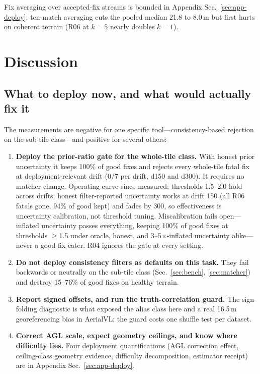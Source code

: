 \documentclass[journal]{IEEEtran}
\begin{document}
Fix averaging over accepted-fix streams is bounded in Appendix Sec.~\ref{sec:app-deploy}: ten-match averaging cuts the pooled median 21.8 to 8.0\,m but first hurts on coherent terrain (R06 at $k{=}5$ nearly doubles $k{=}1$).

\section{Discussion}

\subsection{What to deploy now, and what would actually fix it}
The measurements are negative for one specific tool---consistency-based rejection on the sub-tile class---and positive for several others:
\begin{enumerate}
\item \textbf{Deploy the prior-ratio gate for the whole-tile class.} With honest prior uncertainty it keeps 100\% of good fixes and rejects every whole-tile fatal fix at deployment-relevant drift (0/7 per drift, d150 and d300). It requires no matcher change. Operating curve since measured: thresholds 1.5--2.0 hold across drifts; honest filter-reported uncertainty works at drift 150 (all R06 fatals gone, 94\% of good kept) and fades by 300, so effectiveness is uncertainty calibration, not threshold tuning. Miscalibration fails open---inflated uncertainty passes everything, keeping 100\% of good fixes at thresholds $\geq$1.5 under oracle, honest, and 3--5$\times$-inflated uncertainty alike---never a good-fix eater. R04 ignores the gate at every setting.
\item \textbf{Do not deploy consistency filters as defaults on this task.} They fail backwards or neutrally on the sub-tile class (Sec.~\ref{sec:bench}, \ref{sec:matcher}) and destroy 15--76\% of good fixes on healthy terrain.
\item \textbf{Report signed offsets, and run the truth-correlation guard.} The sign-folding diagnostic is what exposed the alias class here and a real 16.5\,m georeferencing bias in AerialVL; the guard costs one shuffle test per dataset.
\item \textbf{Correct AGL scale, expect geometry ceilings, and know where difficulty lies.} Four deployment quantifications (AGL correction effect, ceiling-class geometry evidence, difficulty decomposition, estimator receipt) are in Appendix Sec.~\ref{sec:app-deploy}.
\end{enumerate}
\end{document}
